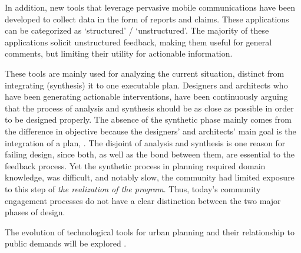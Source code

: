 In addition, new tools that leverage pervasive mobile communications have been developed to collect data in the form of reports and claims. These applications can be categorized as `structured' / `unstructured'. The majority of these applications solicit unstructured feedback, making them useful for general comments, but limiting their utility for actionable information.

These tools are mainly used for analyzing the current situation, distinct from integrating (synthesis) it to one executable plan. Designers and architects who have been generating 
actionable interventions, have been continuously arguing that the process of analysis and synthesis should be as close as possible in order to be designed properly. The absence of the synthetic phase mainly comes from the difference in objective because the designers' and architects' main goal is the integration of a plan, . The disjoint of analysis and synthesis is one reason for failing design, since both, as well as the bond between them, are essential to the feedback process. Yet the synthetic process in planning required domain knowledge, was difficult, and notably slow, the community had limited exposure to this step of \textit{the realization of the program}. Thus, today's community engagement processes do not have a clear distinction between the two major phases of design.

The evolution of technological tools for urban planning and their relationship to public demands will be explored .

